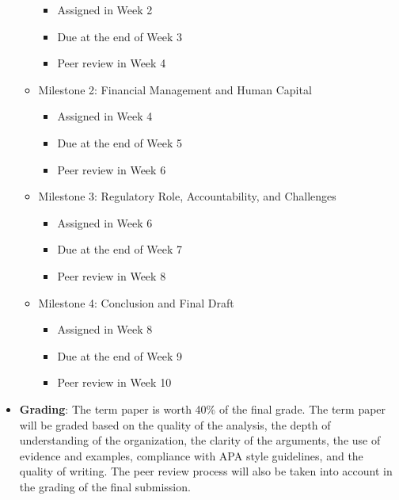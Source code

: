 \documentclass[11pt, letterpaper]{article}
\begin{document}
\begin{itemize}
\begin{itemize}
\begin{itemize}
                    \item Assigned in Week 2 
                    \item Due at the end of Week 3
                    \item Peer review in Week 4
                \end{itemize}
            \item Milestone 2: Financial Management and Human Capital 
                \begin{itemize}
                    \item Assigned in Week 4
                    \item Due at the end of Week 5
                    \item Peer review in Week 6
                \end{itemize}
            
            \item Milestone 3: Regulatory Role, Accountability, and Challenges
                \begin{itemize}
                    \item Assigned in Week 6
                    \item Due at the end of Week 7
                    \item Peer review in Week 8
                \end{itemize}
        
            \item Milestone 4: Conclusion and Final Draft
                \begin{itemize}
                    \item Assigned in Week 8
                    \item Due at the end of Week 9
                    \item Peer review in Week 10
                \end{itemize}
            \end{itemize}
    \item \textbf{Grading}: The term paper is worth 40\% of the final grade. The term paper will be graded based on the quality of the analysis, the depth of understanding of the organization, the clarity of the arguments, the use of evidence and examples, compliance with APA style guidelines, and the quality of writing. The peer review process will also be taken into account in the grading of the final submission.

\end{itemize}
\end{document}
